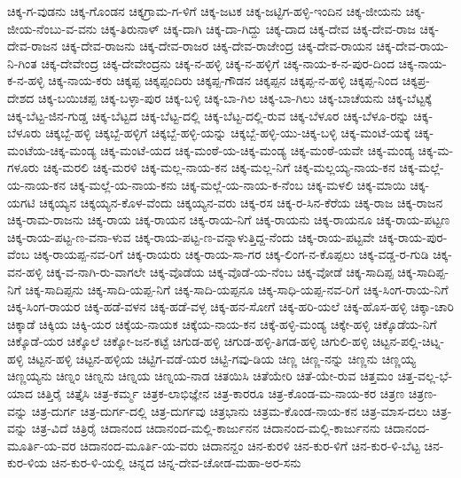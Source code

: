 ಚಿಕ್ಕ-ಗ-ವುಡನು
ಚಿಕ್ಕ-ಗೊಂಡನ
ಚಿಕ್ಕಗ್ರಾಮ-ಗ-ಳಿಗೆ
ಚಿಕ್ಕ-ಜಟಕ
ಚಿಕ್ಕ-ಜಟ್ಟಿಗ-ಹಳ್ಳಿ-ಇಂದಿನ
ಚಿಕ್ಕ-ಜೀಯನು
ಚಿಕ್ಕ-ಜೀಯ-ನೆಂಬು-ವ-ವನು
ಚಿಕ್ಕ-ತಿರುನಾಳ್
ಚಿಕ್ಕ-ದಾಗಿ
ಚಿಕ್ಕ-ದಾ-ಗಿದ್ದು
ಚಿಕ್ಕ-ದಾದ
ಚಿಕ್ಕ-ದೇವ
ಚಿಕ್ಕ-ದೇವ-ರಾಜ
ಚಿಕ್ಕ-ದೇವ-ರಾಜನ
ಚಿಕ್ಕ-ದೇವ-ರಾಜನು
ಚಿಕ್ಕ-ದೇವ-ರಾಜರ
ಚಿಕ್ಕ-ದೇವ-ರಾಜೇಂದ್ರ
ಚಿಕ್ಕ-ದೇವ-ರಾಯನ
ಚಿಕ್ಕ-ದೇವ-ರಾಯ-ನಿ-ಗಿಂತ
ಚಿಕ್ಕ-ದೇವೇಂದ್ರ
ಚಿಕ್ಕ-ದೇವೇಂದ್ರನು
ಚಿಕ್ಕ-ನ-ಹಳ್ಳಿ
ಚಿಕ್ಕ-ನ-ಹಳ್ಳಿಗೆ
ಚಿಕ್ಕ-ನಾಯ-ಕ-ನ-ಪುರ-ದಿಂದ
ಚಿಕ್ಕ-ನಾಯ-ಕ-ನ-ಹಳ್ಳಿ
ಚಿಕ್ಕ-ನಾಯ-ಕರು
ಚಿಕ್ಕಪ್ಪ
ಚಿಕ್ಕಪ್ಪಂದಿರು
ಚಿಕ್ಕಪ್ಪ-ಗೌಡನ
ಚಿಕ್ಕಪ್ಪನ
ಚಿಕ್ಕಪ್ಪ-ನ-ಹಳ್ಳಿ
ಚಿಕ್ಕಪ್ಪ-ನಿಂದ
ಚಿಕ್ಕಪ್ರ-ದೇಶದ
ಚಿಕ್ಕ-ಬಯಿಚಪ್ಪ
ಚಿಕ್ಕ-ಬಳ್ಳಾ-ಪುರ
ಚಿಕ್ಕ-ಬಳ್ಳಿ
ಚಿಕ್ಕ-ಬಾ-ಗಿಲ
ಚಿಕ್ಕ-ಬಾ-ಗಿಲು
ಚಿಕ್ಕ-ಬಾಚೆಯನು
ಚಿಕ್ಕ-ಬೆಟ್ಟಕ್ಕೆ
ಚಿಕ್ಕ-ಬೆಟ್ಟ-ಜಿನ-ಗುಡ್ಡ
ಚಿಕ್ಕ-ಬೆಟ್ಟದ
ಚಿಕ್ಕ-ಬೆಟ್ಟ-ದಲ್ಲಿ
ಚಿಕ್ಕ-ಬೆಟ್ಟ-ದಲ್ಲಿ-ರುವ
ಚಿಕ್ಕ-ಬೆಳೂರ
ಚಿಕ್ಕ-ಬೆಳೂ-ರನ್ನು
ಚಿಕ್ಕ-ಬೆಳೂರು
ಚಿಕ್ಕಬ್ಬೆ-ಹಳ್ಳಿ
ಚಿಕ್ಕಬ್ಬೆ-ಹಳ್ಳಿಗೆ
ಚಿಕ್ಕಬ್ಬೆ-ಹಳ್ಳಿ-ಯನ್ನು
ಚಿಕ್ಕಬ್ಬೆ-ಹಳ್ಳಿ-ಯು-ಚಿಕ್ಕ-ಬಳ್ಳಿ
ಚಿಕ್ಕ-ಮಂಟೆ-ಯಕ್ಕೆ
ಚಿಕ್ಕ-ಮಂಟೆಯ-ಚಿಕ್ಕ-ಮಂಡ್ಯ
ಚಿಕ್ಕ-ಮಂಟೆ-ಯದ
ಚಿಕ್ಕ-ಮಂಠೆ-ಯ-ಚಿಕ್ಕ-ಮಂಡ್ಯ
ಚಿಕ್ಕ-ಮಂಠೆ-ಯವೇ
ಚಿಕ್ಕ-ಮಂಡ್ಯ
ಚಿಕ್ಕ-ಮ-ಗಳೂರು
ಚಿಕ್ಕ-ಮರಲಿ
ಚಿಕ್ಕ-ಮರಳಿ
ಚಿಕ್ಕ-ಮಲ್ಲ-ನಾಯ-ಕನ
ಚಿಕ್ಕ-ಮಲ್ಲ-ನಿಗೆ
ಚಿಕ್ಕ-ಮಲ್ಲಯ್ಯ-ನಾಯ-ಕನ
ಚಿಕ್ಕ-ಮಲ್ಲೆ-ಯ-ನಾಯ-ಕನ
ಚಿಕ್ಕ-ಮಲ್ಲೆ-ಯ-ನಾಯ-ಕನು
ಚಿಕ್ಕ-ಮಲ್ಲೆ-ಯ-ನಾಯ-ಕ-ನೆಂಬ
ಚಿಕ್ಕ-ಮಳಲಿ
ಚಿಕ್ಕ-ಮಾಯಿ
ಚಿಕ್ಕ-ಯಗಟಿ
ಚಿಕ್ಕಯ್ಯನ
ಚಿಕ್ಕಯ್ಯನ-ಕೊಳ-ವೆಂದು
ಚಿಕ್ಕಯ್ಯನ-ವರು
ಚಿಕ್ಕ-ರಸ
ಚಿಕ್ಕ-ರ-ಸಿನ-ಕೆರೆಯ
ಚಿಕ್ಕ-ರಾಜ
ಚಿಕ್ಕ-ರಾಜನ
ಚಿಕ್ಕ-ರಾಮ-ರಾಜನು
ಚಿಕ್ಕ-ರಾಯ
ಚಿಕ್ಕ-ರಾಯನ
ಚಿಕ್ಕ-ರಾಯ-ನಿಗೆ
ಚಿಕ್ಕ-ರಾಯನು
ಚಿಕ್ಕ-ರಾಯನೂ
ಚಿಕ್ಕ-ರಾಯ-ಪಟ್ಟಣ
ಚಿಕ್ಕ-ರಾಯ-ಪಟ್ಟ-ಣ-ವನಾ-ಳುವ
ಚಿಕ್ಕ-ರಾಯ-ಪಟ್ಟ-ಣ-ವನ್ನಾಳುತ್ತಿದ್ದ-ನೆಂದು
ಚಿಕ್ಕ-ರಾಯ-ಪಟ್ಟವೇ
ಚಿಕ್ಕ-ರಾಯ-ಪುರ-ವೆಂಬ
ಚಿಕ್ಕ-ರಾಯಪ್ಪ-ನವ-ರಿಗೆ
ಚಿಕ್ಕ-ರಾಯರು
ಚಿಕ್ಕ-ರಾಯ-ಸಾ-ಗರ
ಚಿಕ್ಕ-ಲಿಂಗ-ನ-ಕೊಪ್ಪಲು
ಚಿಕ್ಕ-ವಡ್ಡ-ರ-ಗುಡಿ
ಚಿಕ್ಕ-ವನ-ಹಳ್ಳಿ
ಚಿಕ್ಕ-ವ-ನಾಗಿ-ರು-ವಾಗಲೇ
ಚಿಕ್ಕ-ವೊಡೆಯ
ಚಿಕ್ಕ-ವೊಡೆ-ಯ-ನೆಂಬ
ಚಿಕ್ಕ-ವೋಡೆ
ಚಿಕ್ಕ-ಸಾದಿಪ್ಪ
ಚಿಕ್ಕ-ಸಾದಿಪ್ಪ-ನಿಗೆ
ಚಿಕ್ಕ-ಸಾದಿಪ್ಪನು
ಚಿಕ್ಕ-ಸಾದಿ-ಯಪ್ಪ-ನಿಗೆ
ಚಿಕ್ಕ-ಸಾದಿ-ಯಪ್ಪನೂ
ಚಿಕ್ಕ-ಸಾಧಿ-ಯಪ್ಪ-ನವ-ರಿಗೆ
ಚಿಕ್ಕ-ಸಿಂಗ-ರಾಯ-ನಿಗೆ
ಚಿಕ್ಕ-ಸಿಂಗ-ರಾಯರ
ಚಿಕ್ಕ-ಹಡೆ-ವಳನ
ಚಿಕ್ಕ-ಹಡೆ-ವಳ್ಳ
ಚಿಕ್ಕ-ಹನ-ಸೋಗೆ
ಚಿಕ್ಕ-ಹರಿ-ಯಲೆ
ಚಿಕ್ಕ-ಹೊಸ-ಹಳ್ಳಿ
ಚಿಕ್ಕಾ-ಚಾರಿ
ಚಿಕ್ಕಾಡೆ
ಚಿಕ್ಕಿಯ
ಚಿಕ್ಕಿ-ಯರ
ಚಿಕ್ಕೆಯ-ನಾಯಕ
ಚಿಕ್ಕೆಯ-ನಾಯ-ಕನ
ಚಿಕ್ಕೆ-ಹಳ್ಳಿ-ಮಂಡ್ಯ
ಚಿಕ್ಕೇ-ಹಳ್ಳಿ
ಚಿಕ್ಕೊಡೆಯ-ನಿಗೆ
ಚಿಕ್ಕೊಡೆ-ಯರ
ಚಿಕ್ಕೊಲೆ
ಚಿಕ್ಕೋ-ಜನ-ಕಟ್ಟೆ
ಚಿಗುಡ-ಹಳ್ಳಿ
ಚಿಗುಡ-ಹಳ್ಳಿ-ತಿಗಡ-ಹಳ್ಳಿ
ಚಿಗುಲಿ-ಹಳ್ಳಿ
ಚಿಟ್ಟನ-ಪಲ್ಲಿ-ಚಿಟ್ನ-ಹಳ್ಳಿ
ಚಿಟ್ಟನ-ಹಳ್ಳಿ
ಚಿಟ್ಟನ-ಹಳ್ಳಿಯ
ಚಿಟ್ಟಿಗ-ವಡೆ-ಯರ
ಚಿಟ್ಟಿ-ಗವು-ಡಿಯ
ಚಿಣ್ಣ
ಚಿಣ್ಣ-ನನ್ನು
ಚಿಣ್ಣನು
ಚಿಣ್ಣಯ್ಯ
ಚಿಣ್ಣಯ್ಯನು
ಚಿಣ್ನಂ
ಚಿಣ್ನನು
ಚಿಣ್ನಯ
ಚಿಣ್ನಯ-ನಾಡ
ಚಿತಯಿಸಿ
ಚಿತೆಯೇರಿ
ಚಿತೆ-ಯೇ-ರುವ
ಚಿತ್ತಮಂ
ಚಿತ್ತ-ವಲ್ಲ-ಭೆ-ಯಾದ
ಚಿತ್ತಿರೈ
ಚಿತ್ತೈಸಿ
ಚಿತ್ರ-ಕರ್ಮ್ಮ
ಚಿತ್ರಕ-ಲಾಭಿಜ್ಞೇನ
ಚಿತ್ರ-ಕಾರರೂ
ಚಿತ್ರ-ಕೊಂಡ-ಮ-ನಾಯ-ಕರ
ಚಿತ್ರಣ
ಚಿತ್ರಣ-ವನ್ನು
ಚಿತ್ರ-ದುರ್ಗ
ಚಿತ್ರ-ದುರ್ಗ-ದಲ್ಲಿ
ಚಿತ್ರ-ದುರ್ಗವು
ಚಿತ್ರಭಾನು
ಚಿತ್ರಮ-ಕೊಂಡ-ನಾಯ-ಕನ
ಚಿತ್ರ-ಮಾಸ-ದಲು
ಚಿತ್ರ-ವನ್ನು
ಚಿತ್ರ-ವಿದೆ
ಚಿತ್ರಿರೈ
ಚಿದಾನಂದ
ಚಿದಾನಂದ-ಮಲ್ಲಿ-ಕಾರ್ಜುನನ
ಚಿದಾನಂದ-ಮಲ್ಲಿ-ಕಾರ್ಜುನನು
ಚಿದಾನಂದ-ಮೂರ್ತಿ-ಯ-ವರ
ಚಿದಾನಂದ-ಮೂರ್ತಿ-ಯ-ವರು
ಚಿದಾನನ್ದಂ
ಚಿನ-ಕುರಳಿ
ಚಿನ-ಕುರ-ಳಿಗೆ
ಚಿನ-ಕುರ-ಳಿ-ಬೆಟ್ಟ
ಚಿನ-ಕುರ-ಳಿಯ
ಚಿನ-ಕುರ-ಳಿ-ಯಲ್ಲಿ
ಚಿನ್ನದ
ಚಿನ್ನ-ದೇವ-ಚೋಡ-ಮಹಾ-ಅರ-ಸನು
